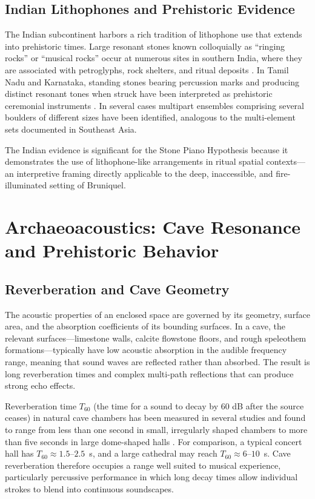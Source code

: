 \documentclass[12pt]{article}
\begin{document}
\subsection{Indian Lithophones and Prehistoric Evidence}

The Indian subcontinent harbors a rich tradition of lithophone use that extends into prehistoric times. Large resonant stones known colloquially as ``ringing rocks'' or ``musical rocks'' occur at numerous sites in southern India, where they are associated with petroglyphs, rock shelters, and ritual deposits \citep{Boivin2004}. In Tamil Nadu and Karnataka, standing stones bearing percussion marks and producing distinct resonant tones when struck have been interpreted as prehistoric ceremonial instruments \citep{Allchin1966}. In several cases multipart ensembles comprising several boulders of different sizes have been identified, analogous to the multi-element sets documented in Southeast Asia.

The Indian evidence is significant for the Stone Piano Hypothesis because it demonstrates the use of lithophone-like arrangements in ritual spatial contexts—an interpretive framing directly applicable to the deep, inaccessible, and fire-illuminated setting of Bruniquel.

\section{Archaeoacoustics: Cave Resonance and Prehistoric Behavior}

\subsection{Reverberation and Cave Geometry}

The acoustic properties of an enclosed space are governed by its geometry, surface area, and the absorption coefficients of its bounding surfaces. In a cave, the relevant surfaces—limestone walls, calcite flowstone floors, and rough speleothem formations—typically have low acoustic absorption in the audible frequency range, meaning that sound waves are reflected rather than absorbed. The result is long reverberation times and complex multi-path reflections that can produce strong echo effects.

Reverberation time $T_{60}$ (the time for a sound to decay by 60 dB after the source ceases) in natural cave chambers has been measured in several studies and found to range from less than one second in small, irregularly shaped chambers to more than five seconds in large dome-shaped halls \citep{Reznikoff1988, Fazenda2017}. For comparison, a typical concert hall has $T_{60} \approx 1.5$--$2.5$~s, and a large cathedral may reach $T_{60} \approx 6$--$10$~s. Cave reverberation therefore occupies a range well suited to musical experience, particularly percussive performance in which long decay times allow individual strokes to blend into continuous soundscapes.
\end{document}
